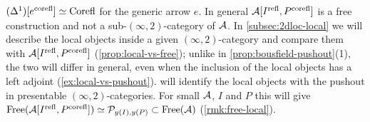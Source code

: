\begin{exmp}
\label{ex:adjoin-basic}
%
$(\Delta^{1})[{e}^{\mathrm{corefl}}] \simeq \mathrm{Corefl}$
for the generic arrow $e$.
In general $\mathcal{A}[{I}^{\mathrm{refl}},{P}^{\mathrm{corefl}}]$ is a free construction and not a
sub-$(\infty,2)$-category of $\mathcal{A}$. In \cref{subsec:2dloc-local} we will describe
the local objects inside a given $(\infty,2)$-category and compare them with
$\mathcal{A}[{I}^{\mathrm{refl}},{P}^{\mathrm{corefl}}]$ (\cref{prop:local-vs-free});
unlike in \cref{prop:bousfield-pushout}(1), the two will differ in general,
even when the inclusion of the local objects has a left adjoint
(\cref{ex:local-vs-pushout}).  will identify the local
objects with the pushout in presentable $(\infty,2)$-categories. For small $\mathcal{A}$,
$I$ and $P$ this will give
$\operatorname{Free}(\mathcal{A}[{I}^{\mathrm{refl}},{P}^{\mathrm{corefl}}]) \simeq \mathcal{P}_{y(I),y(P)} \subset \operatorname{Free}(\mathcal{A})$
(\cref{rmk:free-local}).
\end{exmp}
